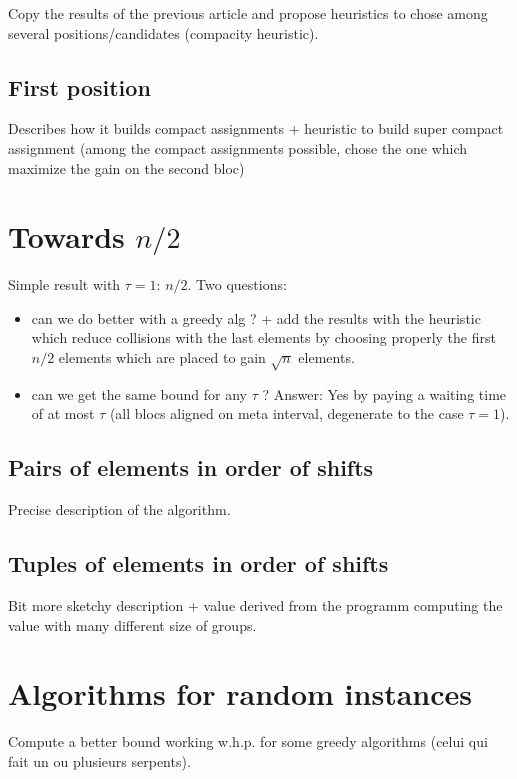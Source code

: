 \documentclass[10pt, conference, letterpaper]{IEEEtran}
\begin{document}
Copy the results of the previous article and propose heuristics to chose among several positions/candidates (compacity heuristic).

\subsection{First position}

Describes how it builds compact assignments 
+ heuristic to build super compact assignment (among the compact assignments
possible, chose the one which maximize the gain on the second bloc)

\section{Towards $n/2$}

Simple result with $\tau = 1$: $n/2$. 
Two questions:
\begin{itemize}
 \item can we do better with a greedy alg ?
+ add the results with the heuristic which reduce collisions with the last elements
by choosing properly the first $n/2$ elements which are placed to gain $\sqrt{n}$ elements. 
\item can we get the same bound for any $\tau$ ?
Answer: Yes by paying a waiting time of at most $\tau$ (all blocs aligned on meta interval,
degenerate to the case $\tau = 1$).
\end{itemize}

\subsection{Pairs of elements in order of shifts}

Precise description of the algorithm. 

\subsection{Tuples of elements in order of shifts}

Bit more sketchy description + value derived from the programm computing the value with many
different size of groups.

\section{Algorithms for random instances}

Compute a better bound working w.h.p. for some greedy algorithms (celui qui fait un ou plusieurs serpents). 
\end{document}
